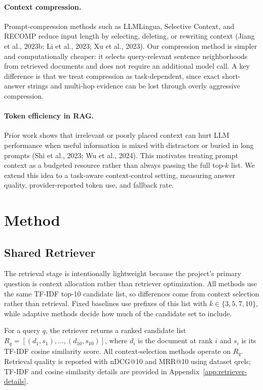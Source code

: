 \documentclass[11pt]{article}
\begin{document}
\paragraph{Context compression.}
Prompt-compression methods such as LLMLingua, Selective Context, and RECOMP reduce input length by selecting, deleting, or rewriting context (Jiang et al., 2023b; Li et al., 2023; Xu et al., 2023). Our compression method is simpler and computationally cheaper: it selects query-relevant sentence neighborhoods from retrieved documents and does not require an additional model call. A key difference is that we treat compression as task-dependent, since exact short-answer strings and multi-hop evidence can be lost through overly aggressive compression.

\paragraph{Token efficiency in RAG.}
Prior work shows that irrelevant or poorly placed context can hurt LLM performance when useful information is mixed with distractors or buried in long prompts (Shi et al., 2023; Wu et al., 2024). This motivates treating prompt context as a budgeted resource rather than always passing the full top-$k$ list. We extend this idea to a task-aware context-control setting, measuring answer quality, provider-reported token use, and fallback rate.

\section{Method}

\subsection{Shared Retriever}

The retrieval stage is intentionally lightweight because the project's primary
question is context allocation rather than retriever optimization. All methods use
the same TF-IDF top-10 candidate list, so differences come from context selection
rather than retrieval. Fixed baselines use prefixes of this list with $k \in
\{3,5,7,10\}$, while adaptive methods decide how much of the candidate set to
include.

For a query $q$, the retriever returns a ranked candidate list
$R_q = [(d_1,s_1),\ldots,(d_{10},s_{10})]$, where $d_i$ is the document at rank $i$
and $s_i$ is its TF-IDF cosine similarity score. All context-selection methods
operate on $R_q$. Retrieval quality is reported with nDCG@10 and MRR@10 using
dataset qrels; TF-IDF and cosine similarity details are provided in
Appendix~\ref{app:retriever-details}.
\end{document}

